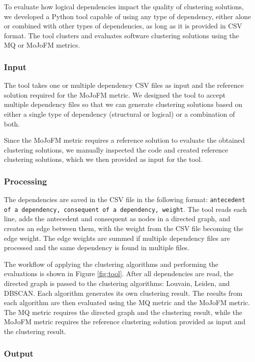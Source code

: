 \documentclass[12pt, a4paper, twoside]{report}
\begin{document}
To evaluate how logical dependencies impact the quality of clustering solutions, we developed a Python tool capable of using any type of dependency, either alone or combined with other types of dependencies, as long as it is provided in CSV format. The tool clusters and evaluates software clustering solutions using the MQ or MoJoFM metrics.



\subsubsection{Input}

The tool takes one or multiple dependency CSV files as input and the reference solution required for the MoJoFM metric. We designed the tool to accept multiple dependency files so that we can generate clustering solutions based on either a single type of dependency (structural or logical) or a combination of both.

Since the MoJoFM metric requires a reference solution to evaluate the obtained clustering solutions, we manually inspected the code and created reference clustering solutions, which we then provided as input for the tool.

\subsubsection{Processing}

The dependencies are saved in the CSV file in the following format: \texttt{antecedent of a dependency, consequent of a dependency, weight}. The tool reads each line, adds the antecedent and consequent as nodes in a directed graph, and creates an edge between them, with the weight from the CSV file becoming the edge weight. The edge weights are summed if multiple dependency files are processed and the same dependency is found in multiple files.

The workflow of applying the clustering algorithms and performing the evaluations is shown in Figure \ref{fig:tool}. After all dependencies are read, the directed graph is passed to the clustering algorithms: Louvain, Leiden, and DBSCAN. Each algorithm generates its own clustering result. The results from each algorithm are then evaluated using the MQ metric and the MoJoFM metric. The MQ metric requires the directed graph and the clustering result, while the MoJoFM metric requires the reference clustering solution provided as input and the clustering result.


\subsubsection{Output}
\end{document}
